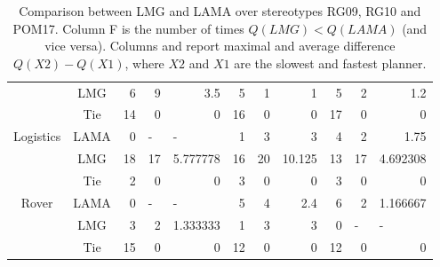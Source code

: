 \documentclass{article}
\begin{document}
\begin{table}[htbp]
\begin{tabular}{|c|c|r|r|r|r|r|r|r|r|r|}
&LMG & 6 & 9 & 3.5 & 5 & 1 & 1 & 5 & 2 & 1.2 \\
&Tie & 14 & 0 & 0 & 16 & 0 & 0 & 17 & 0 & 0 \\ \hline
\multirow{3}{*}{Logistics} & LAMA & 0 & \multicolumn{1}{l|}{-} & \multicolumn{1}{l|}{-} & 1 & 3 & 3 & 4 & 2 & 1.75 \\
&LMG & 18 & 17 & 5.777778 & 16 & 20 & 10.125 & 13 & 17 & 4.692308 \\
&Tie & 2 & 0 & 0 & 3 & 0 & 0 & 3 & 0 & 0 \\ \hline
\multirow{3}{*}{Rover} & LAMA & 0 & \multicolumn{1}{l|}{-} & \multicolumn{1}{l|}{-} & 5 & 4 & 2.4 & 6 & 2 & 1.166667 \\
&LMG & 3 & 2 & 1.333333 & 1 & 3 & 3 & 0 & \multicolumn{1}{l|}{-} & \multicolumn{1}{l|}{-} \\
&Tie & 15 & 0 & 0 & 12 & 0 & 0 & 12 & 0 & 0 \\ \hline
\end{tabular}
\label{LMG:LAMA2}
\caption{Comparison between LMG and LAMA over stereotypes
RG09, RG10 and POM17. Column F is the number of times
$Q(LMG) < Q(LAMA)$ (and vice versa). Columns and
report maximal and average difference $Q(X2) - Q(X1)$, where
$X2$ and $X1$ are the slowest and fastest planner.}
\end{table}
\end{document}
